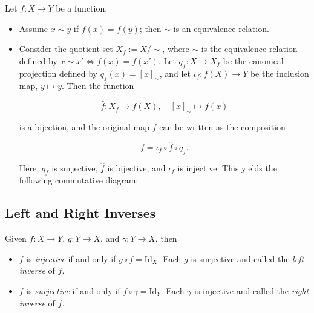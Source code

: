 Let \(f: X \to Y\) be a function.

\begin{itemize}

	\item Assume \(x \sim y\) if \(f(x) = f(y)\); then \(\sim\) is an equivalence relation.

	\item Consider the quotient set \( X_f := X/\sim \), where \( \sim \) is the equivalence relation
	      defined by \( x \sim x' \iff f(x) = f(x') \). Let \( q_f : X \to X_f \) be the canonical
	      projection defined by \( q_f(x) = [x]_{\sim} \), and let \( \iota_f : f(X) \to Y \) be the inclusion
	      map, \( y \mapsto y \). Then the function

	      \[
		      \hat{f} : X_f \to f(X), \quad [x]_{\sim} \mapsto f(x)
	      \]

	      is a bijection, and the original map \(f\) can be written as the composition

	      \[
		      f = \iota_f \circ \hat{f} \circ q_f.
	      \]

	      Here, \( q_f \) is surjective, \( \hat{f} \) is bijective, and \( \iota_f \) is injective.
	      This yields the following commutative diagram:

	      \begin{center}
	      \end{center}

\end{itemize}

\subsection{Left and Right Inverses}

Given \(f: X \to Y\), \(g: Y \to X\), and \(\gamma: Y \to X\), then

\begin{itemize}

	\item \(f\) is \emph{injective} if and only if \(g \circ f = \mathrm{Id}_X\). Each \(g\) is surjective and called the \emph{left inverse} of \(f\).


	\item \(f\) is \emph{surjective} if and only if \(f \circ \gamma = \mathrm{Id}_Y\). Each \(\gamma\) is injective and called the \emph{right inverse} of \(f\).

\end{itemize}

